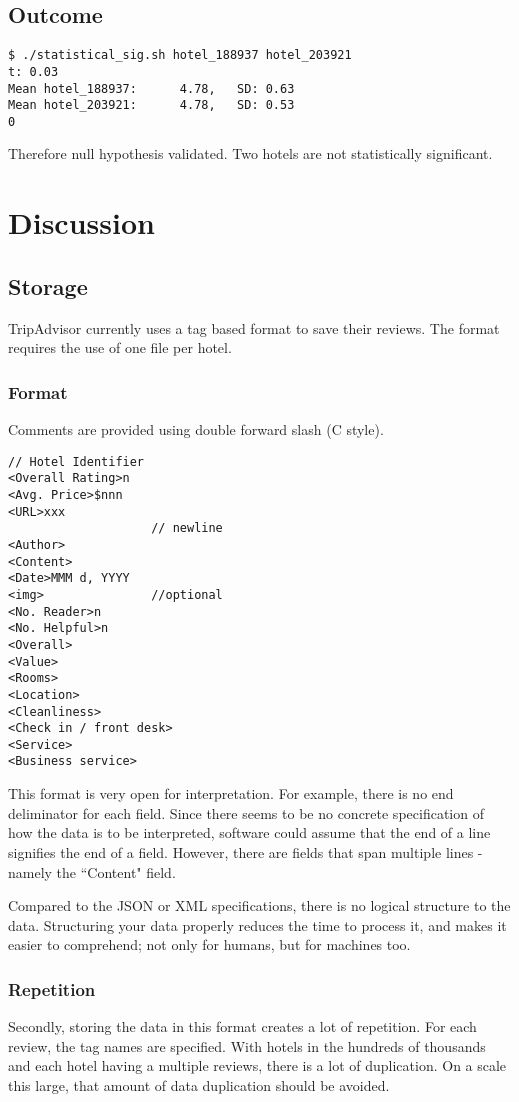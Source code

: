 \documentclass[a4paper]{article}
\begin{document}
\subsection{Outcome}
\begin{lstlisting}[language={}]
$ ./statistical_sig.sh hotel_188937 hotel_203921
t: 0.03
Mean hotel_188937:      4.78,   SD: 0.63
Mean hotel_203921:      4.78,   SD: 0.53
0
\end{lstlisting}
Therefore null hypothesis validated.
Two hotels are not statistically significant.

\newpage
\section{Discussion}

\subsection{Storage}
TripAdvisor currently uses a tag based format to save their reviews.
The format requires the use of one file per hotel.

\subsubsection{Format}
Comments are provided using double forward slash (C style).
\begin{lstlisting}[language={}]
// Hotel Identifier
<Overall Rating>n
<Avg. Price>$nnn
<URL>xxx
					// newline
<Author>
<Content>
<Date>MMM d, YYYY
<img>				//optional
<No. Reader>n
<No. Helpful>n
<Overall>
<Value>
<Rooms>
<Location>
<Cleanliness>
<Check in / front desk>
<Service>
<Business service>
\end{lstlisting}
This format is very open for interpretation.
For example, there is no end deliminator for each field.
Since there seems to be no concrete specification of how the data is to be interpreted, software could assume that the end of a line signifies the end of a field.
However, there are fields that span multiple lines - namely the ``Content" field.

Compared to the JSON or XML specifications, there is no logical structure to the data.
Structuring your data properly reduces the time to process it, and makes it easier to comprehend; not only for humans, but for machines too.

\subsubsection{Repetition}
Secondly, storing the data in this format creates a lot of repetition.
For each review, the tag names are specified.
With hotels in the hundreds of thousands and each hotel having a multiple reviews, there is a lot of duplication.
On a scale this large, that amount of data duplication should be avoided.
\end{document}
